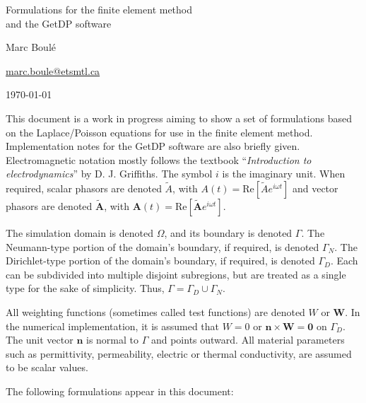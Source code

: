 \documentclass[letterpaper]{article}
\newcommand{\vect}[1]{\mathbf#1}
\newcommand{\vecp}[1]{\tilde{\mathbf#1}}
\begin{document}
\thispagestyle{empty}
\begin{center}

\vspace*{1in}
{
\Large Formulations for the finite element method\\\vspace{6pt}
and the GetDP software}

\vspace*{0.3in}
{Marc Boul\'e} 

\url{marc.boule@etsmtl.ca}

\vspace*{0.1in}
\today

\end{center}

This document is a work in progress aiming to show a set of formulations based on the Laplace/Poisson equations for use in the finite element method. Implementation notes for the GetDP software are also briefly given. Electromagnetic notation mostly follows the textbook ``\textit{Introduction to electrodynamics}'' by D. J. Griffiths. The symbol ${i}$ is the imaginary unit. When required, scalar phasors are denoted $\tilde{A}$, with $A(t)=\text{Re}[\tilde{A}e^{i\omega t}]$ and vector phasors are denoted $\vecp{A}$, with $\vect{A}(t)=\text{Re}[\vecp{A}e^{i\omega t}]$.

The simulation domain is denoted $\Omega$, and its boundary is denoted $\Gamma$. The Neumann-type portion of the domain's boundary, if required, is denoted $\Gamma_N$. The Dirichlet-type portion of the domain's boundary, if required, is denoted $\Gamma_D$. 
Each can be subdivided into multiple disjoint subregions, but are treated as a single type for the sake of simplicity. 
Thus, $\Gamma=\Gamma_D\cup\Gamma_N$.

All weighting functions (sometimes called test functions) are denoted $W$ or $\vect{W}$. In the numerical implementation, it is assumed that $W=0$ or $\vect{n}\times\vect{W}=\vect{0}$ on $\Gamma_D$. The unit vector $\vect{n}$ is normal to $\Gamma$ and points outward. All material parameters such as permittivity, permeability, electric or thermal conductivity, are assumed to be scalar values.

The following formulations appear in this document:
\end{document}
